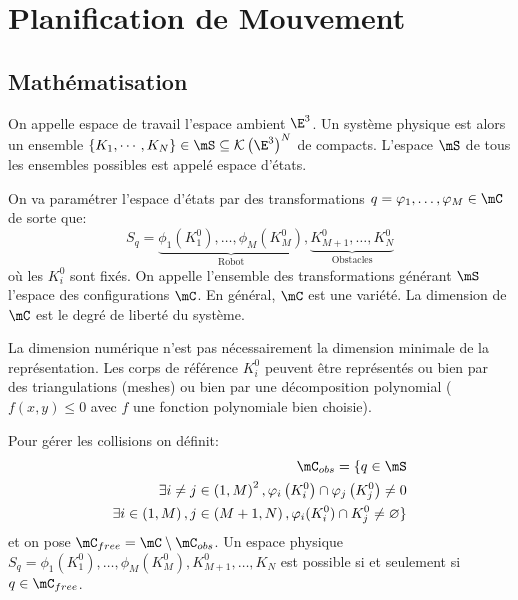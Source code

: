 \documentclass[math]{cours}
\begin{document}
\section{Planification de Mouvement}
\subsection{Mathématisation}
\begin{definition}
	On appelle espace de travail l'espace ambient $\E^{3}$.
	Un système physique est alors un ensemble $\{K_{1}, \cdots, K_{N}\} \in \mS \subseteq \mathcal{K}\left(\E^{3}\right)^{N}$ de compacts.
	L'espace $\mS$ de tous les ensembles possibles est appelé espace d'états.
	\label{def:motionplanningspace}
\end{definition}


\begin{definition}
	On va paramétrer l'espace d'états par des transformations $q = \phi_{1}, \ldots, \phi_{M} \in \mC$ de sorte que:
	\begin{equation*}
		S_{q} = \underbrace{\phi_{1}(K_{1}^{0}), \ldots, \phi_{M}(K_{M}^{0})}_{\text{Robot}}, \underbrace{K_{M+1}^{0}, \ldots, K_{N}^{0}}_{\text{Obstacles}}
	\end{equation*}
	où les $K_{i}^{0}$ sont fixés.
	On appelle l'ensemble des transformations générant $\mS$ l'espace des configurations $\mC$.
	En général, $\mC$ est une variété. La dimension de $\mC$ est le degré de liberté du système.
\end{definition}
La dimension numérique n'est pas nécessairement la dimension minimale de la représentation.
Les corps de référence $K_{i}^{0}$ peuvent être représentés ou bien par des triangulations (meshes) ou bien par une décomposition polynomial ($f(x, y) \leq 0$ avec $f$ une fonction polynomiale bien choisie).

\begin{definition}
Pour gérer les collisions on définit:
\begin{align*}
	\mC_{obs} = \{q \in \mS \\
			\exists i\neq j \in \left(1, M\right)^{2}, \phi_{i}\left(K_{i}^{0}\right)\cap \phi_{j}\left(K_{j}^{0}\right) \neq 0 \\
			\exists i \in \left(1, M\right), j\in \left(M + 1, N\right), \phi_{i}(K_{i}^{0}) \cap K_{j}^{0} \neq \emptyset\}
	\end{align*}
et on pose $\mC_{free} = \mC \setminus\mC_{obs}$.
Un espace physique $S_{q} = \phi_{1}\left(K_{1}^{0}\right), \ldots, \phi_{M}(K_{M}^{0}), K_{M + 1}^{0}, \ldots, K_{N}$ est possible si et seulement si $q \in \mC_{free}$.
\end{definition}
\end{document}
